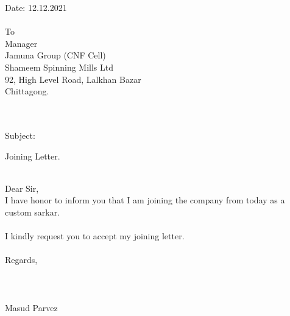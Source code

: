 \documentclass[12pt]{article}
\begin{document}
\noindent
\large
Date: 12.12.2021
\\
\\
To
\\
Manager
\\
Jamuna Group (CNF Cell)
\\
Shameem Spinning Mills Ltd
\\
92, High Level Road, Lalkhan Bazar
\\
Chittagong.
\\
\\
\\
\begin{minipage}[t]{0.12\linewidth}
Subject:
\end{minipage}
\begin{minipage}[t]{0.88\linewidth}
Joining Letter.
\\
\\
\end{minipage}
Dear Sir,
\\
I have honor to inform you that I am joining the company from today as a custom sarkar.
\\
\\
I kindly request you to accept my joining letter.
\\
\\
Regards,
\\
\\
\\
\\
Masud Parvez
\pagestyle{empty}
\end{document}
